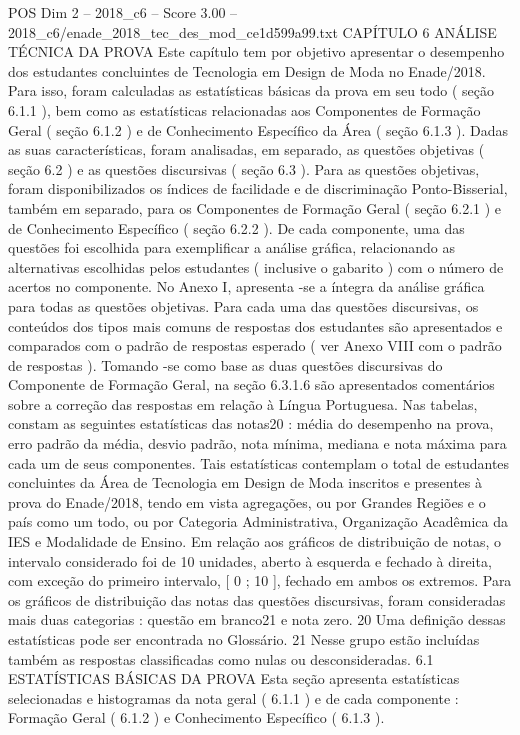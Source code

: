 \begin{textsample}{POS Dim 2 – 2018\_c6 – Score 3.00 – 2018\_c6/enade\_2018\_tec\_des\_mod\_ce1d599a99.txt}  \label{ex:f2_pos_192}
CAPÍTULO 6 ANÁLISE TÉCNICA DA PROVA Este capítulo tem por objetivo apresentar o desempenho dos estudantes concluintes de Tecnologia em Design de Moda no Enade/2018.
Para isso, foram calculadas as estatísticas básicas da prova em seu todo ( seção 6.1.1 ), bem como as estatísticas relacionadas aos Componentes de Formação Geral ( seção 6.1.2 ) e de Conhecimento Específico da Área ( seção 6.1.3 ).
Dadas as suas características, foram analisadas, em separado, as questões objetivas ( seção 6.2 ) e as questões discursivas ( seção 6.3 ).
Para as questões objetivas, foram disponibilizados os índices de facilidade e de discriminação Ponto-Bisserial, também em separado, para os Componentes de Formação Geral ( seção 6.2.1 ) e de Conhecimento Específico ( seção 6.2.2 ).
De cada componente, uma das questões foi escolhida para exemplificar a análise gráfica, relacionando as alternativas escolhidas pelos estudantes ( inclusive o gabarito ) com o número de acertos no componente.
No Anexo I, apresenta -se a íntegra da análise gráfica para todas as questões objetivas.
Para cada uma das questões discursivas, os conteúdos dos tipos mais comuns de respostas dos estudantes são apresentados e comparados com o padrão de respostas esperado ( ver Anexo VIII com o padrão de respostas ).
Tomando -se como base as duas questões discursivas do Componente de Formação Geral, na seção 6.3.1.6 são apresentados comentários sobre a correção das respostas em relação à Língua Portuguesa.
Nas tabelas, constam as seguintes estatísticas das notas20 : média do desempenho na prova, erro padrão da média, desvio padrão, nota mínima, mediana e nota máxima para cada um de seus componentes.
Tais estatísticas contemplam o total de estudantes concluintes da Área de Tecnologia em Design de Moda inscritos e presentes à prova do Enade/2018, tendo em vista agregações, ou por Grandes Regiões e o país como um todo, ou por Categoria Administrativa, Organização Acadêmica da IES e Modalidade de Ensino.
Em relação aos gráficos de distribuição de notas, o intervalo considerado foi de 10 unidades, aberto à esquerda e fechado à direita, com exceção do primeiro intervalo, [ 0 ; 10 ], fechado em ambos os extremos.
Para os gráficos de distribuição das notas das questões discursivas, foram consideradas mais duas categorias : questão em branco21 e nota zero. 20 Uma definição dessas estatísticas pode ser encontrada no Glossário. 21 Nesse grupo estão incluídas também as respostas classificadas como nulas ou desconsideradas. 6.1 ESTATÍSTICAS BÁSICAS DA PROVA Esta seção apresenta estatísticas selecionadas e histogramas da nota geral ( 6.1.1 ) e de cada componente : Formação Geral ( 6.1.2 ) e Conhecimento Específico ( 6.1.3 ).

\end{textsample}
